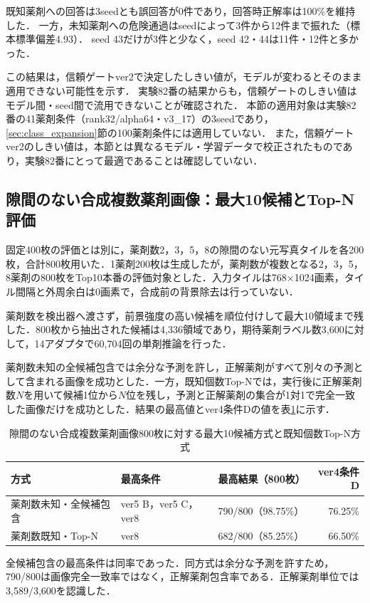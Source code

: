 \documentclass[uplatex,dvipdfmx]{jsarticle}
\begin{document}
既知薬剤への回答は3seedとも誤回答が0件であり，回答時正解率は100\%を維持した．
一方，未知薬剤への危険通過はseedによって3件から12件まで振れた（標本標準偏差4.93）．
seed 43だけが3件と少なく，seed 42・44は11件・12件と多かった．

この結果は，信頼ゲートver2で決定したしきい値が，モデルが変わるとそのまま適用できない可能性を示す．
実験82番の結果からも，信頼ゲートのしきい値はモデル間・seed間で流用できないことが確認された．
本節の適用対象は実験82番の41薬剤条件（rank32/alpha64・v3\_17）の3seedであり，\ref{sec:class_expansion}節の100薬剤条件には適用していない．
また，信頼ゲートver2のしきい値は，本節とは異なるモデル・学習データで校正されたものであり，実験82番にとって最適であることは確認していない．
\subsection{隙間のない合成複数薬剤画像：最大10候補とTop-N評価}\label{sec:zero_gap_top10_results}

固定400枚の評価とは別に，薬剤数2，3，5，8の隙間のない元写真タイルを各200枚，合計800枚用いた．1薬剤200枚は生成したが，薬剤数が複数となる2，3，5，8薬剤の800枚をTop10本番の評価対象とした．入力タイルは768$\times$1024画素，タイル間隔と外周余白は0画素で，合成前の背景除去は行っていない．

薬剤数を検出器へ渡さず，前景強度の高い候補を順位付けして最大10領域まで残した．800枚から抽出された候補は4,336領域であり，期待薬剤ラベル数3,600に対して，14アダプタで60,704回の単剤推論を行った．

薬剤数未知の全候補包含では余分な予測を許し，正解薬剤がすべて別々の予測として含まれる画像を成功とした．一方，既知個数Top-Nでは，実行後に正解薬剤数$N$を用いて候補1位から$N$位を残し，予測と正解薬剤の集合が1対1で完全一致した画像だけを成功とした．結果の最高値とver4条件Dの値を表\ref{tab:zero_gap_top10_summary}に示す．

\begin{table}[htbp]
  \centering
  \caption{隙間のない合成複数薬剤画像800枚に対する最大10候補方式と既知個数Top-N方式}
  \label{tab:zero_gap_top10_summary}
  \small
  \setlength{\tabcolsep}{3pt}
  \begin{tabular}{|p{4.0cm}|p{3.2cm}|r|r|}
    \hline
    方式 & 最高条件 & 最高結果（800枚） & ver4条件D \\ \hline
    薬剤数未知・全候補包含 & ver5 B，ver5 C，ver8 & 790/800（98.75\%） & 76.25\% \\ \hline
    薬剤数既知・Top-N & ver8 & 682/800（85.25\%） & 66.50\% \\ \hline
  \end{tabular}

  \vspace{1mm}
  {\scriptsize 全候補包含の最高条件は同率であった．同方式は余分な予測を許すため，790/800は画像完全一致率ではなく，正解薬剤包含率である．正解薬剤単位では3,589/3,600を認識した．}
\end{table}
\end{document}
